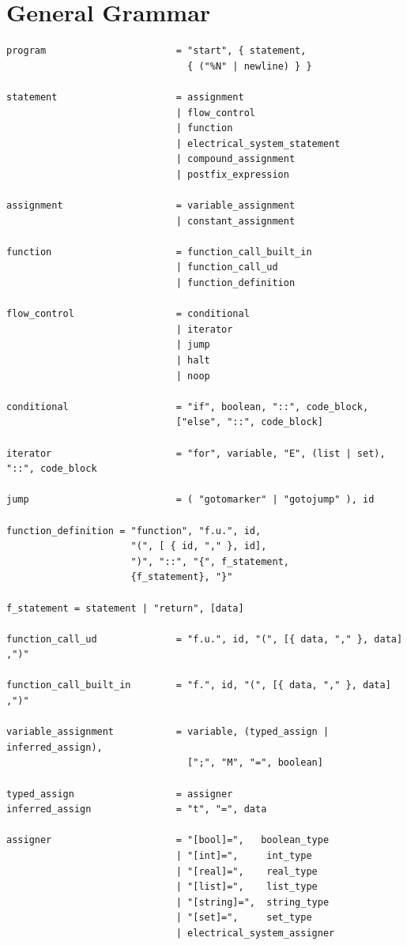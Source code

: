 \documentclass{report}
\begin{document}
\section{General Grammar}
\begin{verbatim}
program                       = "start", { statement, 
                                { ("%N" | newline) } }

statement                     = assignment
                              | flow_control
                              | function
                              | electrical_system_statement
                              | compound_assignment
                              | postfix_expression

assignment                    = variable_assignment          
                              | constant_assignment

function                      = function_call_built_in
                              | function_call_ud
                              | function_definition

flow_control                  = conditional
                              | iterator
                              | jump
                              | halt
                              | noop

conditional                   = "if", boolean, "::", code_block,
                              ["else", "::", code_block]

iterator                      = "for", variable, "E", (list | set), "::", code_block

jump                          = ( "gotomarker" | "gotojump" ), id

function_definition = "function", "f.u.", id, 
                      "(", [ { id, "," }, id], 
                      ")", "::", "{", f_statement, 
                      {f_statement}, "}"

f_statement = statement | "return", [data]

function_call_ud              = "f.u.", id, "(", [{ data, "," }, data] ,")"

function_call_built_in        = "f.", id, "(", [{ data, "," }, data] ,")"

variable_assignment           = variable, (typed_assign | inferred_assign),
                                [";", "M", "=", boolean]

typed_assign                  = assigner
inferred_assign               = "t", "=", data

assigner                      = "[bool]=",   boolean_type
                              | "[int]=",     int_type
                              | "[real]=",    real_type
                              | "[list]=",    list_type
                              | "[string]=",  string_type
                              | "[set]=",     set_type
                              | electrical_system_assigner


\end{verbatim}
\end{document}
